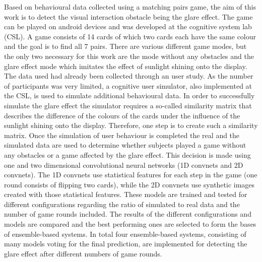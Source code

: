 Based on behavioural data collected using a matching pairs game, the aim of this work is to detect the visual interaction obstacle being the glare effect. The game can be played on android devices and was developed at the cognitive system lab (CSL). A game consists of 14 cards of which two cards each have the same colour and the goal is to find all 7 pairs. There are various different game modes, but the only two necessary for this work are the mode without any obstacles and the glare effect mode which imitates the effect of sunlight shining onto the display. The data used had already been collected through an user study. As the number of participants was very limited, a cognitive user simulator, also implemented at the CSL, is used to simulate additional behavioural data. In order to successfully simulate the glare effect the simulator requires a so-called similarity matrix that describes the difference of the colours of the cards under the influence of the sunlight shining onto the display. Therefore, one step is to create such a similarity matrix. Once the simulation of user behaviour is completed the real and the simulated data are used to determine whether subjects played a game without any obstacles or a game affected by the glare effect. This decision is made using one and two dimensional convolutional neural networks (1D convnets and 2D convnets). The 1D convnets use statistical features for each step in the game (one round consists of flipping two cards), while the 2D convnets use synthetic images created with those statistical features. These models are trained and tested for different configurations regarding the ratio of simulated to real data and the number of game rounds included. The results of the different configurations and models are compared and the best performing ones are selected to form the bases of ensemble-based systems. In total four ensemble-based systems, consisting of many models voting for the final prediction, are implemented for detecting the glare effect after different numbers of game rounds.






